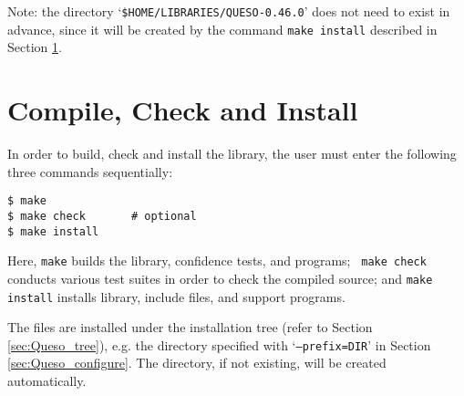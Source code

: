 Note: the directory `\verb+$HOME/LIBRARIES/QUESO-0.46.0+' does not need to exist in advance, since it will be created by the command \verb+make install+ described in Section \ref{sec:install_Queso_make}.


\section{Compile, Check and Install \Queso{}}\label{sec:install_Queso_make}
%
In order to build, check and install the library, the user must enter the following three commands sequentially:
\begin{lstlisting}
$ make
$ make check       # optional
$ make install 
\end{lstlisting}

Here, \verb+make+ builds the library, confidence tests, and programs;  \verb+ make check+ conducts various test suites in order to check the compiled source; and \verb+make install+ installs \Queso{} library, include files, and support programs.

The files are installed under the installation tree (refer to Section \ref{sec:Queso_tree}), e.g. the directory specified with `\texttt{--prefix=DIR}' in Section \ref{sec:Queso_configure}. The directory, if not existing, will be created automatically.%

% 
% 
% 
% 


